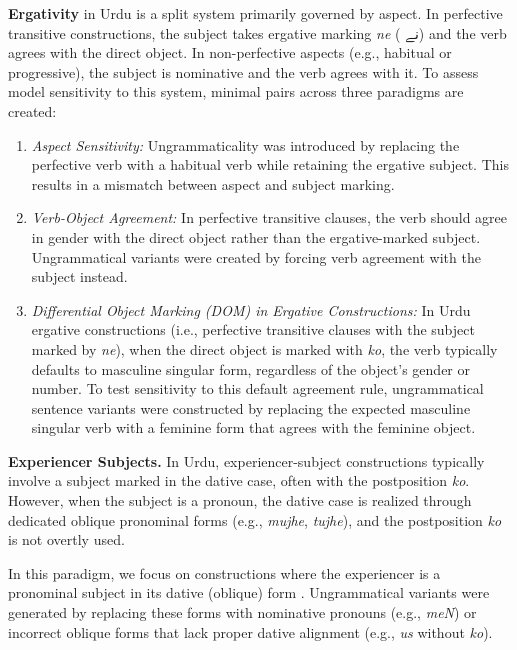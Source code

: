 \documentclass[11pt]{article}
\begin{document}
\textbf{Ergativity} in Urdu is a split system primarily governed by aspect. In perfective transitive constructions, the subject takes ergative marking {\em ne} ( \foreignlanguage{arabic}{نے}) and the verb agrees with the direct object. In non-perfective aspects (e.g., habitual or progressive), the subject is nominative and the verb agrees with it. To assess model sensitivity to this system, minimal pairs across three paradigms are created:
\begin{enumerate}
    \item \textit{Aspect Sensitivity:} Ungrammaticality was introduced by replacing the perfective verb with a habitual verb while retaining the ergative subject. This results in a mismatch between aspect and subject marking.
    
    \item \textit{Verb-Object Agreement:} In perfective transitive clauses, the verb should agree in gender with the direct object rather than the ergative-marked subject. Ungrammatical variants were created by forcing verb agreement with the subject instead.
    
  \item \textit{Differential Object Marking (DOM) in Ergative Constructions:}
In Urdu ergative constructions (i.e., perfective transitive clauses with the subject marked by \textit{ne}), when the direct object is marked with \textit{ko}, the verb typically defaults to masculine singular form, regardless of the object’s gender or number. To test sensitivity to this default agreement rule, ungrammatical sentence variants were constructed by replacing the expected masculine singular verb with a feminine form that agrees with the feminine object.


\end{enumerate}

\textbf{Experiencer Subjects.} In Urdu, experiencer-subject constructions typically involve a subject marked in the dative case, often with the postposition \textit{ko}. However, when the subject is a pronoun, the dative case is realized through dedicated oblique pronominal forms (e.g., \textit{mujhe}, \textit{tujhe}), and the postposition \textit{ko} is not overtly used. 

In this paradigm, we focus on constructions where the experiencer is a pronominal subject in its dative (oblique) form . Ungrammatical variants were generated by replacing these forms with nominative pronouns (e.g., \textit{meN}) or incorrect oblique forms that lack proper dative alignment (e.g., \textit{us} without \textit{ko}).
\end{document}
